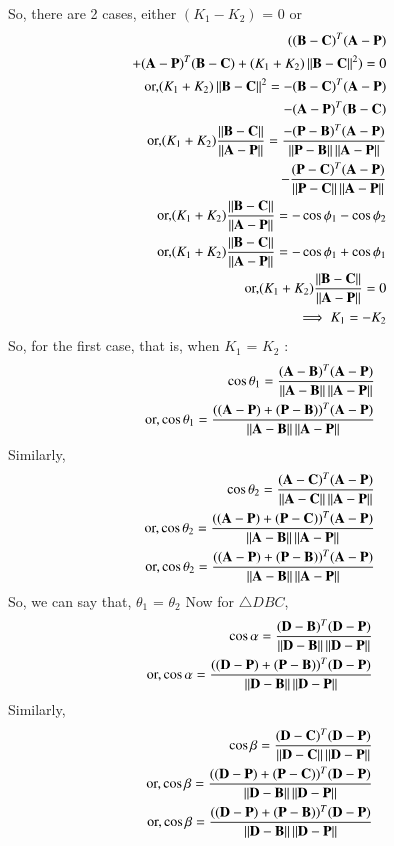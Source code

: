 \documentclass[journal,12pt,twocolumn]{IEEEtran}
\begin{document}
So, there are 2 cases, either $(K_1 - K_2)$ = 0 or 
\begin{align}
((\mathbf{B-C})^T (\mathbf{A-P}) \\
+ (\mathbf{A-P})^T (\mathbf{B-C}) + (K_1 + K_2)\left\lVert\mathbf{B-C}\right\rVert^2)= 0\\
\text{or,}(K_1 + K_2)\left\lVert\mathbf{B-C}\right\rVert^2 = - (\mathbf{B-C})^T (\mathbf{A-P})\\
-(\mathbf{A-P})^T (\mathbf{B-C})\\
\text{or,}(K_1 + K_2)\frac{\left\lVert\mathbf{B-C}\right\rVert}{\left\lVert\mathbf{A-P}\right\rVert}= \frac{- (\mathbf{P-B})^T (\mathbf{A-P})}{\left\lVert\mathbf{P-B}\right\rVert \left\lVert\mathbf{A-P}\right\rVert}\\
 - \frac{(\mathbf{P-C})^T (\mathbf{A-P})}{\left\lVert\mathbf{P-C}\right\rVert \left\lVert\mathbf{A-P}\right\rVert}\\
\text{or,}(K_1 + K_2)\frac{\left\lVert\mathbf{B-C}\right\rVert}{\left\lVert\mathbf{A-P}\right\rVert} = - \cos\phi_1 - \cos\phi_2\\
\text{or,}(K_1 + K_2)\frac{\left\lVert\mathbf{B-C}\right\rVert}{\left\lVert\mathbf{A-P}\right\rVert} = - \cos\phi_1 + \cos\phi_1\\
\text{or,}(K_1 + K_2)\frac{\left\lVert\mathbf{B-C}\right\rVert}{\left\lVert\mathbf{A-P}\right\rVert} = 0\\
\implies K_1 = -K_2
\end{align}
So, for the first case, that is, when $K_1$ = $K_2$ :
\begin{align}
\cos\theta_1 = \frac{(\mathbf{A-B})^T (\mathbf{A-P})}{\left\lVert\mathbf{A-B}\right\rVert\left\lVert\mathbf{A-P}\right\rVert}\\
\text{or,}\cos\theta_1  = \frac{((\mathbf{A-P})+(\mathbf{P-B}))^T (\mathbf{A-P})}{\left\lVert\mathbf{A-B}\right\rVert\left\lVert\mathbf{A-P}\right\rVert}
\end{align}
Similarly,
\begin{align}
\cos\theta_2 = \frac{(\mathbf{A-C})^T (\mathbf{A-P})}{\left\lVert\mathbf{A-C}\right\rVert\left\lVert\mathbf{A-P}\right\rVert}\\
\text{or,}\cos\theta_2  = \frac{((\mathbf{A-P})+(\mathbf{P-C}))^T (\mathbf{A-P})}{\left\lVert\mathbf{A-B}\right\rVert\left\lVert\mathbf{A-P}\right\rVert}\\
\text{or,}\cos\theta_2  = \frac{((\mathbf{A-P})+(\mathbf{P-B}))^T (\mathbf{A-P})}{\left\lVert\mathbf{A-B}\right\rVert\left\lVert\mathbf{A-P}\right\rVert}
\end{align}
So, we can say that, $\theta_1$ = $\theta_2$
Now for $\triangle DBC$,
\begin{align}
\cos\alpha = \frac{(\mathbf{D-B})^T (\mathbf{D-P})}{\left\lVert\mathbf{D-B}\right\rVert\left\lVert\mathbf{D-P}\right\rVert}\\
\text{or,}\cos\alpha  = \frac{((\mathbf{D-P})+(\mathbf{P-B}))^T (\mathbf{D-P})}{\left\lVert\mathbf{D-B}\right\rVert\left\lVert\mathbf{D-P}\right\rVert}
\end{align}
Similarly,
\begin{align}
\cos\beta = \frac{(\mathbf{D-C})^T (\mathbf{D-P})}{\left\lVert\mathbf{D-C}\right\rVert\left\lVert\mathbf{D-P}\right\rVert}\\
\text{or,}\cos\beta = \frac{((\mathbf{D-P})+(\mathbf{P-C}))^T (\mathbf{D-P})}{\left\lVert\mathbf{D-B}\right\rVert\left\lVert\mathbf{D-P}\right\rVert}\\
\text{or,}\cos\beta  = \frac{((\mathbf{D-P})+(\mathbf{P-B}))^T (\mathbf{D-P})}{\left\lVert\mathbf{D-B}\right\rVert\left\lVert\mathbf{D-P}\right\rVert}
\end{align}
\end{document}
